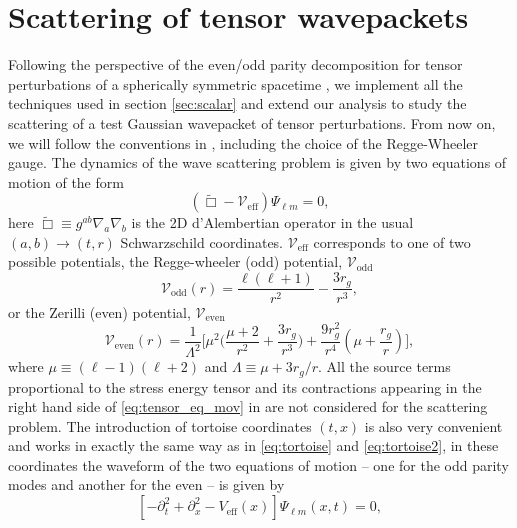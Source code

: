 \documentclass[article,aps,nofootinbib,twocolumn,superscriptaddress]{revtex4-1}
\begin{document}
\section{Scattering of tensor wavepackets}\label{sec:tensor} 
Following the perspective of the even/odd parity decomposition for tensor perturbations of a spherically symmetric spacetime \citep{Regge:1957td, PhysRevD.2.2141, PhysRevD.5.2419}, we implement all the techniques used in section \ref{sec:scalar} and extend our analysis to study the scattering of a test Gaussian wavepacket of tensor perturbations. From now on, we will follow the conventions in \citep{Martel:2005ir}, including the choice of the Regge-Wheeler gauge. 
The dynamics of the wave scattering problem is given by two equations of motion of the form
\begin{equation}
\left(\tilde{\Box}-\mathcal{V}_{\mathrm{eff}}\right)\Psi_{\ell m}=0,
\label{eq:tensor_eq_mov}
\end{equation} 
here $\tilde{\Box}\equiv g^{ab}\nabla_a\nabla_b$ is the 2D d'Alembertian operator in the usual $(a,b)\rightarrow(t,r)$ Schwarzschild coordinates. $\mathcal{V}_{\mathrm{eff}}$ corresponds to one of two possible potentials, the Regge-wheeler (odd) potential, $\mathcal{V}_{\mathrm{odd}}$ 
\begin{equation}
\mathcal{V}_{\mathrm{odd}}(r)= \frac{\ell(\ell+1)}{r^2}-\frac{3r_g}{r^3},
\label{eq:V_odd}
\end{equation} 
or the Zerilli (even) potential, $\mathcal{V}_{\mathrm{even}}$ 
\begin{equation}
\mathcal{V}_{\mathrm{even}}(r)=\displaystyle{\frac{1}{\Lambda^2}\bigg[\mu^2\bigg(\frac{\mu+2}{r^2}+\frac{3r_g}{r^3}\bigg)+\frac{9r_g^2}{r^4}\left(\mu+\frac{r_g}{r}\right)\bigg]},
\label{eq:V_even}
\end{equation} 
where $\mu\equiv(\ell-1)(\ell+2)$ and $\Lambda\equiv\mu+3r_g/r$. All the source terms proportional to the stress energy tensor and its contractions appearing in the right hand side of \eqref{eq:tensor_eq_mov} in \citep{Martel:2005ir} are not considered for the scattering problem. The introduction of tortoise coordinates $(t,x)$ is also very convenient and works in exactly the same way as in \eqref{eq:tortoise} and \eqref{eq:tortoise2}, in these coordinates the waveform of the two equations of motion -- one for the odd parity modes and another for the even -- is given by 
\begin{equation}
\left[-\partial_t^2+\partial_x^2-V_{\mathrm{eff}}(x)\right]\Psi_{\ell m}(x,t) = 0,
\label{eq:wave_tensor_wh}
\end{equation}
\end{document}
